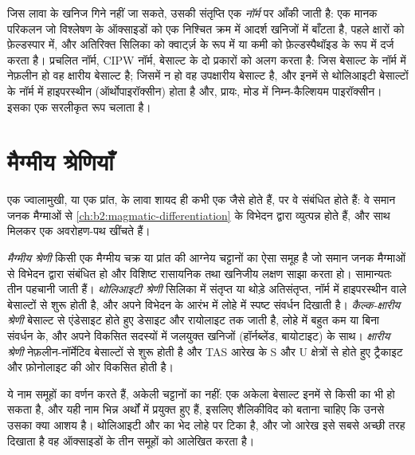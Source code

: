 जिस लावा के खनिज गिने नहीं जा सकते, उसकी संतृप्ति एक \emph{नॉर्म} पर आँकी जाती है: एक
मानक परिकलन जो विश्लेषण के ऑक्साइडों को एक निश्चित क्रम में आदर्श खनिजों में बाँटता है,
पहले क्षारों को फ़ेल्डस्पार में, और अतिरिक्त सिलिका को
क्वार्ट्ज़ के रूप में या कमी को फ़ेल्डस्पैथॉइड के रूप में दर्ज करता है। प्रचलित नॉर्म, CIPW नॉर्म,
बेसाल्ट के दो प्रकारों को अलग करता है: जिस बेसाल्ट के नॉर्म में नेफ़लीन हो वह क्षारीय बेसाल्ट है; जिसमें
न हो वह उपक्षारीय बेसाल्ट है, और इनमें से थोलिआइटी बेसाल्टों के नॉर्म में
हाइपरस्थीन (ऑर्थोपाइरॉक्सीन) होता है और, प्रायः, मोड में निम्न-कैल्शियम पाइरॉक्सीन।
 इसका एक सरलीकृत रूप चलाता है।

\section{मैग्मीय श्रेणियाँ}\label{sec:b2:magmatic-series:series}

एक ज्वालामुखी, या एक प्रांत, के लावा शायद ही कभी एक जैसे होते हैं, पर वे संबंधित होते हैं: वे
समान जनक मैग्माओं से \cref{ch:b2:magmatic-differentiation} के विभेदन द्वारा
व्युत्पन्न होते हैं, और साथ मिलकर एक अवरोहण-पथ खींचते हैं।

\begin{definition}[मैग्मीय श्रेणी]\label{def:b2:magmatic-series:series}
\emph{मैग्मीय श्रेणी} किसी एक
मैग्मीय चक्र या प्रांत की आग्नेय चट्टानों का ऐसा समूह है जो समान जनक मैग्माओं से विभेदन द्वारा संबंधित हो और
विशिष्ट रासायनिक तथा खनिजीय लक्षण साझा करता हो। सामान्यतः तीन
पहचानी जाती हैं। \emph{थोलिआइटी श्रेणी} सिलिका में संतृप्त या थोड़े अतिसंतृप्त,
नॉर्म में हाइपरस्थीन वाले बेसाल्टों से शुरू होती है,
और अपने विभेदन के आरंभ में लोहे में स्पष्ट संवर्धन दिखाती है।
\emph{कैल्क-क्षारीय श्रेणी} बेसाल्ट से
एंडेसाइट होते हुए डेसाइट और रायोलाइट तक जाती है, लोहे में बहुत कम या बिना संवर्धन के, और
अपने विकसित सदस्यों में जलयुक्त खनिजों (हॉर्नब्लेंड, बायोटाइट) के साथ। \emph{क्षारीय
श्रेणी} नेफ़लीन-नॉर्मेटिव बेसाल्टों से शुरू होती है और
TAS आरेख के S और U क्षेत्रों से होते हुए ट्रैकाइट और फ़ोनोलाइट की ओर विकसित होती है।
\end{definition}

ये नाम समूहों का वर्णन करते हैं, अकेली चट्टानों का नहीं: एक अकेला बेसाल्ट इनमें से किसी का भी
हो सकता है, और यही नाम भिन्न अर्थों में प्रयुक्त हुए हैं, इसलिए शैलिकीविद को
बताना चाहिए कि उनसे उसका क्या आशय है। थोलिआइटी और
 का भेद लोहे पर टिका है, और जो आरेख इसे सबसे अच्छी तरह दिखाता है वह ऑक्साइडों के तीन
समूहों को आलेखित करता है।

